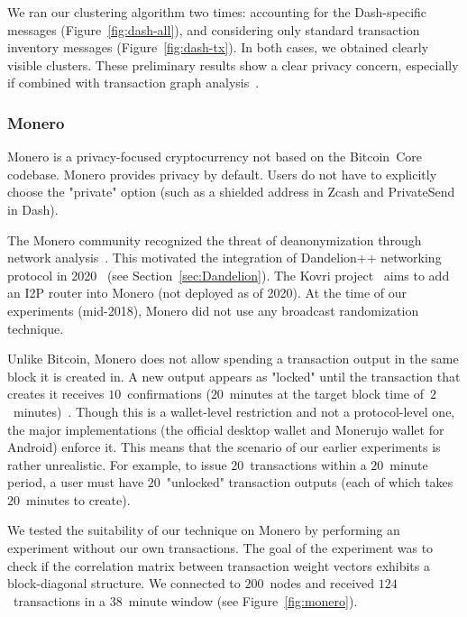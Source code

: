 We ran our clustering algorithm two times: accounting for the Dash-specific messages (Figure~\ref{fig:dash-all}), and considering only standard transaction inventory messages (Figure~\ref{fig:dash-tx}).
In both cases, we obtained clearly visible clusters.
These preliminary results show a clear privacy concern, especially if combined with transaction graph analysis~\cite{Kalodner2017}. 


\subsubsection{Monero}

Monero is a privacy-focused cryptocurrency not based on the Bitcoin~Core codebase.
Monero provides privacy by default.
Users do not have to explicitly choose the "private" option (such as a shielded address in Zcash and PrivateSend in Dash).

The Monero community recognized the threat of deanonymization through network analysis~\cite{user36432017, manontheinside2016, expez2016, Cameron2016}.
This motivated the integration of Dandelion++ networking protocol in 2020~\cite{ErCiccione2020} (see Section~\ref{sec:Dandelion}).
The Kovri project~\cite{Kovri} aims to add an I2P router into Monero (not deployed as of 2020).
At the time of our experiments (mid-2018), Monero did not use any broadcast randomization technique.

Unlike Bitcoin, Monero does not allow spending a transaction output in the same block it is created in.
A new output appears as "locked" until the transaction that creates it receives $10$~confirmations ($20$~minutes at the target block time of~$2$~minutes)~\cite{dpzz2017}.
Though this is a wallet-level restriction and not a protocol-level one, the major implementations (the official desktop wallet and Monerujo wallet for Android) enforce it.
This means that the scenario of our earlier experiments is rather unrealistic.
For example, to issue $20$~transactions within a $20$~minute period, a user must have $20$~"unlocked" transaction outputs (each of which takes $20$~minutes to create).

We tested the suitability of our technique on Monero by performing an experiment without our own transactions.
The goal of the experiment was to check if the correlation matrix between transaction weight vectors exhibits a block-diagonal structure.
We connected to $200$~nodes and received $124$~transactions in a $38$~minute window (see Figure~\ref{fig:monero}).

